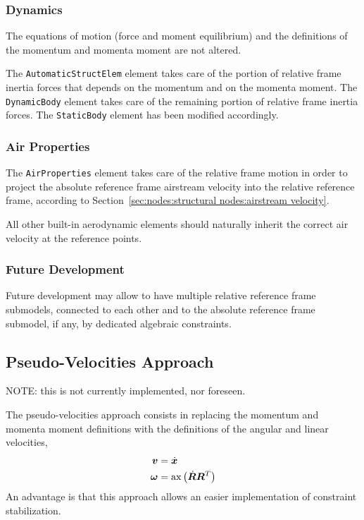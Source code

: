 \documentclass[10pt,fleqn,subeqn]{report}
\newcommand{\T}[1]{\bm{#1}}
\newcommand{\TT}[1]{\bm{#1}}
\begin{document}
\subsubsection{Dynamics}
The equations of motion (force and moment equilibrium)
and the definitions of the momentum and momenta moment are not altered.

The \texttt{AutomaticStructElem} element takes care of the portion
of relative frame inertia forces that depends on the momentum
and on the momenta moment.
The \texttt{DynamicBody} element takes care of the remaining portion
of relative frame inertia forces.
The \texttt{StaticBody} element has been modified accordingly.

\subsubsection{Air Properties}
The \texttt{AirProperties} element takes care of the relative frame motion
in order to project the absolute reference frame airstream velocity
into the relative reference frame,
according to Section~\ref{sec:nodes:structural nodes:airstream velocity}.

All other built-in aerodynamic elements should naturally inherit
the correct air velocity at the reference points.


\subsubsection{Future Development}
Future development may allow to have multiple relative reference frame
submodels, connected to each other and to the absolute reference frame
submodel, if any, by dedicated algebraic constraints.




\subsection{Pseudo-Velocities Approach}
\label{sec:nodes:structural nodes:pseudo-velocities approach}
NOTE: this is not currently implemented, nor foreseen.

The pseudo-velocities approach consists in replacing the momentum
and momenta moment definitions with the definitions of the angular
and linear velocities,
\begin{subequations}
\begin{align}
	\T{v} &= \dot{\T{x}} \\
	\T{\omega} &= \mathrm{ax}\plbr{\dot{\TT{R}} \TT{R}^T}
\end{align}
\end{subequations}
An advantage is that this approach allows an easier implementation
of constraint stabilization.
\end{document}
